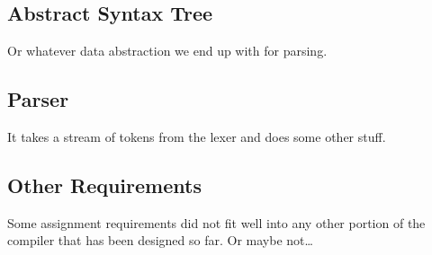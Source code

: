\documentclass[pdftex,11pt,a4paper]{article}
\begin{document}
\subsection{Abstract Syntax Tree}

Or whatever data abstraction we end up with for parsing.


\subsection{Parser}

It takes a stream of tokens from the lexer and does some other stuff.


\subsection{Other Requirements}

Some assignment requirements did not fit well into any other portion
of the compiler that has been designed so far. Or maybe not\ldots
\end{document}
